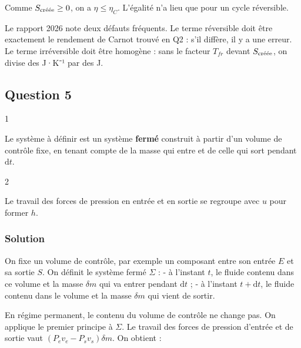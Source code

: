\documentclass[11pt,a4paper]{article}
\newcommand{\equationajustee}[1]{%
  \sbox{\boiteequation}{$\displaystyle #1$}%
  \ifdim\wd\boiteequation>\linewidth
    \[\resizebox{\linewidth}{!}{\usebox{\boiteequation}}\]%
  \else
    \[#1\]%
  \fi}
\begin{document}
Comme \(S_{\text{\text{créée}}}\ge0\), on a \(\eta\le\eta_C\). L'égalité n'a lieu que pour un cycle réversible.

\begin{piege}

Le rapport 2026 note deux défauts fréquents. Le terme réversible doit être exactement le rendement de Carnot trouvé en Q2 : s'il diffère, il y a une erreur. Le terme irréversible doit être homogène : sans le facteur \(T_{fr}\) devant \(S_{\text{\text{créée}}}\), on divise des J·K⁻¹ par des J.

\end{piege}

\hypertarget{question-5}{%
\subsection{Question 5}\label{question-5}}

\begin{indication}{1}

Le système à définir est un système \textbf{fermé} construit à partir d'un volume de contrôle fixe, en tenant compte de la masse qui entre et de celle qui sort pendant \(\mathrm{d}t\).

\end{indication}

\begin{indication}{2}

Le travail des forces de pression en entrée et en sortie se regroupe avec \(u\) pour former \(h\).

\end{indication}

\hypertarget{solution-4}{%
\subsubsection{Solution}\label{solution-4}}

On fixe un volume de contrôle, par exemple un composant entre son entrée \(E\) et sa sortie \(S\). On définit le système fermé \(\Sigma\) :
- à l'instant \(t\), le fluide contenu dans ce volume et la masse \(\delta m\) qui va entrer pendant \(\mathrm{d}t\) ;
- à l'instant \(t+\mathrm{d}t\), le fluide contenu dans le volume et la masse \(\delta m\) qui vient de sortir.

En régime permanent, le contenu du volume de contrôle ne change pas. On applique le premier principe à \(\Sigma\). Le travail des forces de pression d'entrée et de sortie vaut \((P_ev_e-P_sv_s)\delta m\). On obtient :
\equationajustee{\boxed{\Delta h+\Delta\!\left(\frac{c^2}{2}\right)+g\Delta z=w_u+q}}
\end{document}
